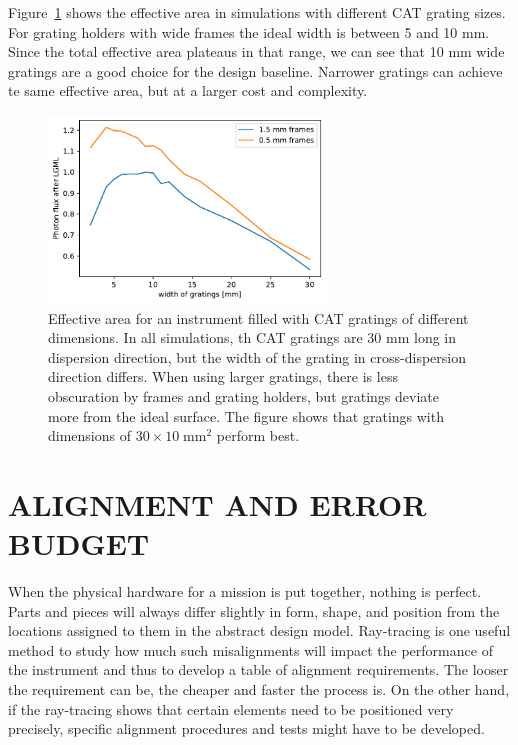 \documentclass[]{spie}  %
\begin{document}
Figure~\ref{fig:width} shows the effective area in simulations with
different CAT grating sizes. For grating holders with wide frames the
ideal width is between 5 and 10 mm. Since the total effective area
plateaus in that range, we can see that 10 mm wide gratings are a good
choice for the design baseline. Narrower gratings can achieve te same
effective area, but at a larger cost and complexity.
\begin{figure} [ht]
  \begin{center}
    \includegraphics[height=5cm]{catdimensions.pdf}
  \end{center}
  \caption
      { \label{fig:width}Effective area for an instrument filled with
        CAT gratings of different dimensions. In all simulations, th
        CAT gratings are 30 mm long in dispersion direction, but the
        width of the grating in cross-dispersion direction
        differs. When using larger gratings, there is less obscuration
        by frames and grating holders, but gratings deviate more from
        the ideal surface. The figure shows that gratings with
        dimensions of $30\times10\;\mathrm{mm}^2$ perform best.  }
\end{figure}

\section{ALIGNMENT AND ERROR BUDGET}
\label{sect:align}
When the physical hardware for a mission is put together, nothing is
perfect. Parts and pieces will always differ slightly in form, shape,
and position from the locations assigned to them in the abstract
design model. Ray-tracing is one useful method to study how much such
misalignments will impact the performance of the instrument and thus
to develop a table of alignment requirements. The looser the
requirement can be, the cheaper and faster the process is. On the
other hand, if the ray-tracing shows that certain elements need to be
positioned very precisely, specific alignment procedures and tests
might have to be developed.
\end{document}
